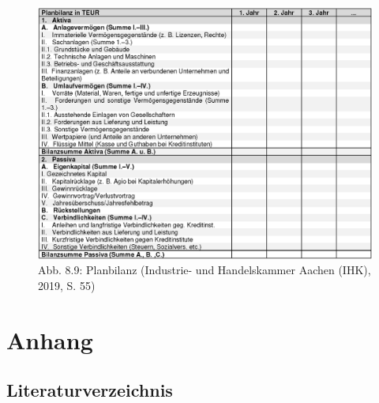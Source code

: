 \documentclass[
  letterpaper,
]{book}
\begin{document}
\begin{figure}

\includegraphics[width=0.75\linewidth,height=\textheight,keepaspectratio]{images/figure89.png} \hfill{}

\caption{Abb. 8.9: Planbilanz (Industrie- und Handelskammer Aachen
(IHK), 2019, S. 55)}

\end{figure}%

\part{Anhang}

\chapter{Literaturverzeichnis}\label{literaturverzeichnis}
\end{document}

